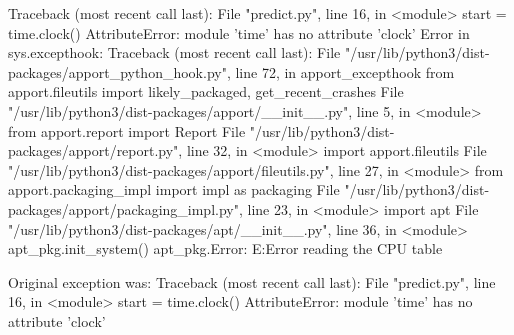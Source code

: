 Traceback (most recent call last):
  File "predict.py", line 16, in <module>
    start = time.clock()
AttributeError: module 'time' has no attribute 'clock'
Error in sys.excepthook:
Traceback (most recent call last):
  File "/usr/lib/python3/dist-packages/apport_python_hook.py", line 72, in apport_excepthook
    from apport.fileutils import likely_packaged, get_recent_crashes
  File "/usr/lib/python3/dist-packages/apport/__init__.py", line 5, in <module>
    from apport.report import Report
  File "/usr/lib/python3/dist-packages/apport/report.py", line 32, in <module>
    import apport.fileutils
  File "/usr/lib/python3/dist-packages/apport/fileutils.py", line 27, in <module>
    from apport.packaging_impl import impl as packaging
  File "/usr/lib/python3/dist-packages/apport/packaging_impl.py", line 23, in <module>
    import apt
  File "/usr/lib/python3/dist-packages/apt/__init__.py", line 36, in <module>
    apt_pkg.init_system()
apt_pkg.Error: E:Error reading the CPU table

Original exception was:
Traceback (most recent call last):
  File "predict.py", line 16, in <module>
    start = time.clock()
AttributeError: module 'time' has no attribute 'clock'
